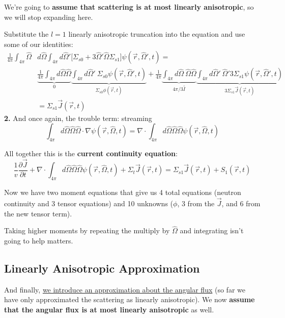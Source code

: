 \documentclass[12pt]{article}
\newcommand{\vOmega}{\ensuremath{\hat{\Omega}}}
\begin{document}
We're going to \textbf{assume that scattering is at most linearly anisotropic}, so we will stop expanding here.

Substitute the $l=1$ linearly anisotropic truncation into the equation and use some of our identities:
%
\begin{align}
\frac{1}{4\pi} \int_{4\pi}  \vOmega &d\vOmega \int_{4\pi} d\vOmega' \bigl[\Sigma_{s0} + 3\vOmega' \vOmega \Sigma_{s1} \bigr] \psi(\vec{r}, \vOmega', t) = \nonumber\\
%
& \underbrace{\frac{1}{4\pi} \int_{4\pi} d\vOmega \vOmega}_{0}  \underbrace{\int_{4\pi} d\vOmega'\:  \Sigma_{s0}\psi(\vec{r}, \vOmega', t)}_{\Sigma_{s0} \phi(\vec{r},t)} +
%
\frac{1}{4\pi} \underbrace{\int_{4\pi} d\vOmega \:\vOmega \vOmega}_{4\pi/3 \bar{\bar{I}}} \underbrace{\int_{4\pi} d\vOmega'\: \vOmega' 3  \Sigma_{s1}\psi(\vec{r}, \vOmega', t)}_{3\Sigma_{s1} \vec{J}(\vec{r},t)} \\
%
&= \boxed{\Sigma_{s1} \vec{J}(\vec{r},t)}
\end{align}
\textbf{2.} And once again, the trouble term: streaming
%
\[\int_{4\pi} d\vOmega \vOmega \vOmega \cdot \nabla \psi(\vec{r}, \vOmega, t) = \nabla \cdot \int_{4\pi} d\vOmega \vOmega \vOmega \psi(\vec{r}, \vOmega, t) \]

\vspace*{2em}
All together this is the \textbf{current continuity equation}:
\begin{equation}
\frac{1}{v}\frac{\partial \vec{J}}{\partial t} 
+ \nabla \cdot \int_{4\pi} d\vOmega \vOmega \vOmega \psi(\vec{r}, \vOmega, t) +
\Sigma_t  \vec{J}(\vec{r}, t) =
\Sigma_{s1} \vec{J}(\vec{r},t)
+ S_{1}(\vec{r}, t) 
\label{eq:current1}
\end{equation}

Now we have two moment equations that give us 4 total equations (neutron continuity and 3 tensor equations) and 10 unknowns ($\phi$, 3 from the $\vec{J}$, and 6 from the new tensor term). 

Taking higher moments by repeating the multiply by $\vOmega$ and integrating isn't going to help matters.


\subsection{Linearly Anisotropic Approximation}
And finally, \underline{we introduce an approximation about the angular flux} (so far we have only approximated the scattering as linearly anisotropic). We now \textbf{assume that the angular flux is at most linearly anisotropic} as well.
\end{document}
